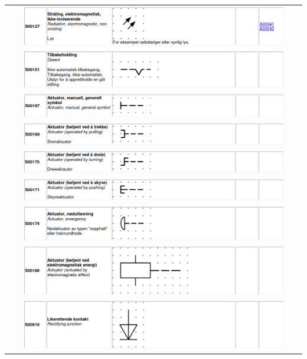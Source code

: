 \documentclass{article}
\begin{document}
\begin{center}
\begin{longtable}{c}
        \includegraphics[width=0.9\textwidth]{bilder/s00127.png}\\
        \includegraphics[width=0.9\textwidth]{bilder/s00151.png}\\
        \includegraphics[width=0.9\textwidth]{bilder/s00167.png}\\
        \includegraphics[width=0.9\textwidth]{bilder/s00169.png}\\
        \includegraphics[width=0.9\textwidth]{bilder/s00170.png}\\
        \includegraphics[width=0.9\textwidth]{bilder/s00171.png}\\
        \includegraphics[width=0.9\textwidth]{bilder/s00174.png}\\
        \includegraphics[width=0.9\textwidth]{bilder/s00189.png}\\
        \includegraphics[width=0.9\textwidth]{bilder/s00619.png}\\

\end{longtable}
\end{center}
\end{document}
